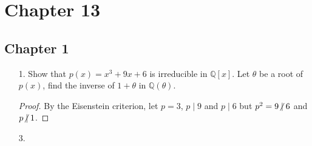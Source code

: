 \documentclass[hidelinks,12pt]{article}
\title{\scalebox{2}{Math 835 Homework 1}}
\author{\scalebox{1.5}{Theo Koss}}
\date{September 2024}
\newcommand{\Q}{\mathbb{Q}}
\begin{document}
\maketitle
\section{Chapter 13}
\subsection{Chapter 1}
\begin{enumerate}
    \item[1.] Show that $p(x)=x^3+9x+6$ is irreducible in $\Q[x]$. Let $\theta$ be a root of $p(x)$, find the inverse of $1+\theta$ in $\Q(\theta)$.
        \begin{proof}
            By the Eisenstein criterion, let $p=3$, $p\mid 9$ and $p\mid 6$ but $p^2=9\centernot\mid 6$ and $p\centernot\mid 1$.
            
        \end{proof}
        
   \item[3.]
\end{enumerate}
\end{document}
